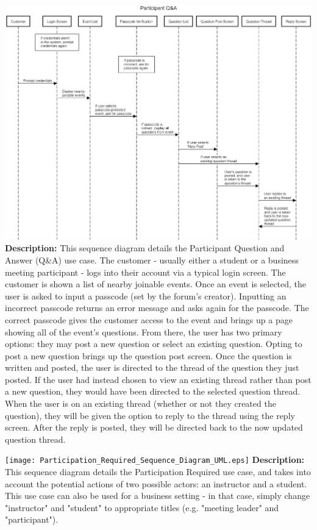 \documentclass[12pt]{article}
\begin{document}
\includegraphics[width=\textwidth]{Participant_QA_Sequence_Diagram_UML.eps}
\textbf{Description:} This sequence diagram details the Participant Question and Answer (Q\&A) use case. The customer - usually either a student or a business meeting participant - logs into their account via a typical login screen. The customer is shown a list of nearby joinable events. Once an event is selected, the user is asked to input a passcode (set by the forum's creator). Inputting an incorrect passcode returns an error message and asks again for the passcode. The correct passcode gives the customer access to the event and brings up a page showing all of the event's questions. From there, the user has two primary options: they may post a new question or select an existing question. Opting to post a new question brings up the question post screen. Once the question is written and posted, the user is directed to the thread of the question they just posted. If the user had instead chosen to view an existing thread rather than post a new question, they would have been directed to the selected question thread. When the user is on an existing thread (whether or not they created the question), they will be given the option to reply to the thread using the reply screen. After the reply is posted, they will be directed back to the now updated question thread.

\texttt{[image: Participation\_Required\_Sequence\_Diagram\_UML.eps]}
\textbf{Description:} This sequence diagram details the Participation Required use case, and takes into account the potential actions of two possible actors: an instructor and a student. This use case can also be used for a business setting - in that case, simply change "instructor" and "student" to appropriate titles (e.g. "meeting leader" and "participant").
\end{document}
